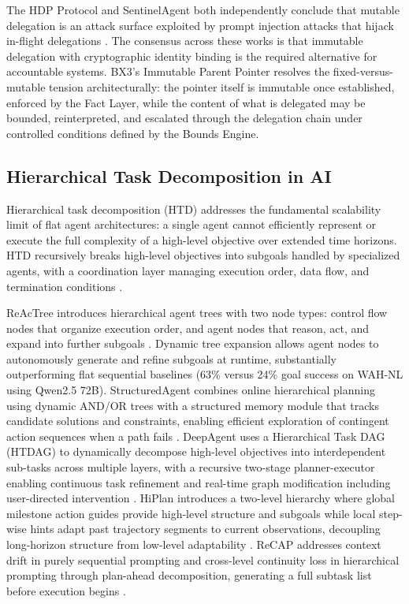 The HDP Protocol and SentinelAgent both independently conclude that mutable delegation is an attack surface exploited by prompt injection attacks that hijack in-flight delegations \cite{hdp2025arxiv, sentinelagent2026}. The consensus across these works is that immutable delegation with cryptographic identity binding is the required alternative for accountable systems. BX3's Immutable Parent Pointer resolves the fixed-versus-mutable tension architecturally: the pointer itself is immutable once established, enforced by the Fact Layer, while the content of what is delegated may be bounded, reinterpreted, and escalated through the delegation chain under controlled conditions defined by the Bounds Engine.

\subsection{Hierarchical Task Decomposition in AI}

Hierarchical task decomposition (HTD) addresses the fundamental scalability limit of flat agent architectures: a single agent cannot efficiently represent or execute the full complexity of a high-level objective over extended time horizons. HTD recursively breaks high-level objectives into subgoals handled by specialized agents, with a coordination layer managing execution order, data flow, and termination conditions \cite{reactree2025, deepagent2025, structuredagent2025}.

ReAcTree introduces hierarchical agent trees with two node types: control flow nodes that organize execution order, and agent nodes that reason, act, and expand into further subgoals \cite{reactree2025}. Dynamic tree expansion allows agent nodes to autonomously generate and refine subgoals at runtime, substantially outperforming flat sequential baselines (63\% versus 24\% goal success on WAH-NL using Qwen2.5 72B). StructuredAgent combines online hierarchical planning using dynamic AND/OR trees with a structured memory module that tracks candidate solutions and constraints, enabling efficient exploration of contingent action sequences when a path fails \cite{structuredagent2025}. DeepAgent uses a Hierarchical Task DAG (HTDAG) to dynamically decompose high-level objectives into interdependent sub-tasks across multiple layers, with a recursive two-stage planner-executor enabling continuous task refinement and real-time graph modification including user-directed intervention \cite{deepagent2025}. HiPlan introduces a two-level hierarchy where global milestone action guides provide high-level structure and subgoals while local step-wise hints adapt past trajectory segments to current observations, decoupling long-horizon structure from low-level adaptability \cite{hiplan2025}. ReCAP addresses context drift in purely sequential prompting and cross-level continuity loss in hierarchical prompting through plan-ahead decomposition, generating a full subtask list before execution begins \cite{recap2025}.

